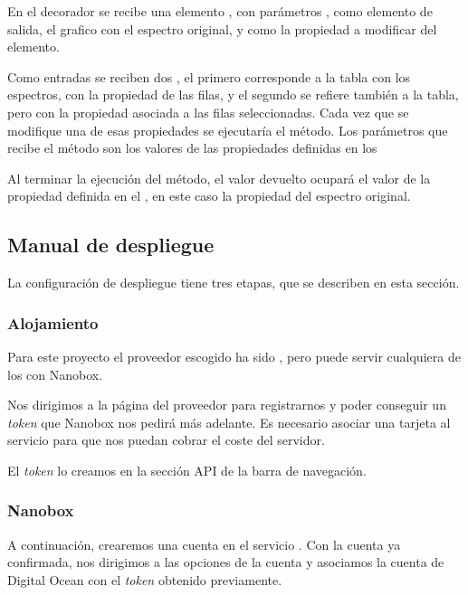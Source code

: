 En el decorador se recibe una elemento , con parámetros 
, como elemento de salida, el grafico con el espectro 
original, y  como la propiedad a modificar del elemento.

Como entradas se reciben dos , el primero corresponde a la tabla 
con los espectros, con la propiedad de las filas, y el segundo se refiere 
también a la tabla, pero con la propiedad asociada a las filas seleccionadas. 
Cada vez que se modifique una de esas propiedades se ejecutaría el método. Los 
parámetros que recibe el método son los valores de las propiedades definidas en 
los 

Al terminar la ejecución del método, el valor devuelto ocupará el valor de la 
propiedad definida en el , en este caso la propiedad  
del espectro original.

\subsection{Manual de despliegue}

La configuración de despliegue tiene tres etapas, que se describen en esta 
sección.

\subsubsection{Alojamiento}

Para este proyecto el proveedor escogido ha sido 
, pero puede servir 
cualquiera de los 
 con Nanobox.

Nos dirigimos a la página del proveedor para registrarnos y poder conseguir un 
\textit{token} que Nanobox nos pedirá más adelante. Es necesario asociar una 
tarjeta al servicio para que nos puedan cobrar el coste del servidor.

El \textit{token} lo creamos en la sección API de la barra de navegación.

\subsubsection{Nanobox}

A continuación, crearemos una cuenta en el servicio . Con la cuenta ya confirmada, nos dirigimos a las 
opciones de la cuenta y asociamos la cuenta de Digital Ocean con el 
\textit{token} obtenido previamente.

